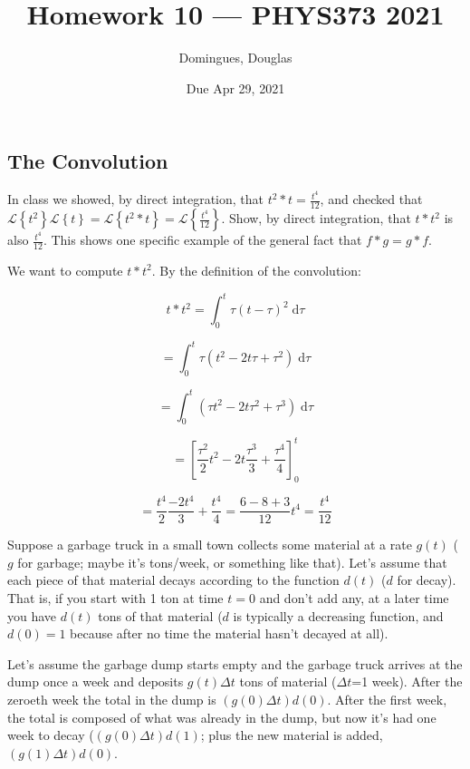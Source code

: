 \documentclass[answers]{exam}\newcommand{\repositoryInformationSetup}{     \usepackage[dvipsnames]{xcolor}     \usepackage[ angle=90, color=black, opacity=1, scale=2, ]{background}      \SetBgPosition{current page.west}      \SetBgVshift{-4.5mm}      \backgroundsetup{contents={{\color{green}\texttt{-{}-} differs from commit \texttt{40a9b87} in 0 files}}} } \newcommand{\commit}{{{\color{green}40a9b87}}}\usepackage{amsmath}
\newcommand{\laplace}[1]{\ensuremath{\mathcal{L}\left\{#1\right\}}\xspace}
\providecommand{\id}{}
\renewcommand{\id}[1]{\ensuremath{\; \mathrm{d}#1}}
\begin{document}
\title{Homework 10 --- PHYS373 2021}

\author{Domingues, Douglas}

\date{Due Apr 29, 2021}

\maketitle

\begin{questions}
	\section*{The Convolution}
	\question In class we showed, by direct integration, that $t^2*t = \frac{t^4}{12}$, and checked that $\laplace{t^2}\laplace{t} = \laplace{t^2*t} = \laplace{\frac{t^4}{12}}$.
	Show, by direct integration, that $t*t^2$ is also $\frac{t^4}{12}$.
	This shows one specific example of the general fact that $f*g = g*f$.

	\begin{solution}
		We want to compute $t \ast t^2$. By the definition of the convolution:

		$$t \ast t^2 = \int_0^t \tau (t-\tau)^2 \id{\tau}$$

		$$ = \int_0^t \tau (t^2 -2 t \tau + \tau ^2) \id{\tau}$$

		$$ = \int_0^t  (\tau t^2 -2 t \tau^2 + \tau ^3) \id{\tau}$$

		$$ = [\frac{\tau^2}{2} t^2 -2 t \frac{\tau^3}{3} + \frac{\tau ^4}{4}]_0^t$$

		$$ = \frac{t^4}{2} \frac{-2 t^4}{3} + \frac{t^4}{4} = \frac{6 - 8 + 3}{12} t^4 = \frac{t^4}{12}$$

	\end{solution}


	\question Suppose a garbage truck in a small town collects some material at a rate $g(t)$ ($g$ for garbage; maybe it's tons/week, or something like that).
	Let's assume that each piece of that material decays according to the function $d(t)$ ($d$ for decay).
	That is, if you start with 1 ton at time $t=0$ and don't add any, at a later time you have $d(t)$ tons of that material ($d$ is typically a decreasing function, and $d(0)=1$ because after no time the material hasn't decayed at all).

	Let's assume the garbage dump starts empty and the garbage truck arrives at the dump once a week and deposits $g(t) \Delta t$ tons of material ($\Delta t$=1 week).
	After the zeroeth week the total in the dump is $(g(0) \Delta t) d(0)$.
	After the first week, the total is composed of what was already in the dump, but now it's had one week to decay ($(g(0) \Delta t) d(1)$; plus the new material is added, $(g(1) \Delta t) d(0)$.


\end{questions}
\end{document}
